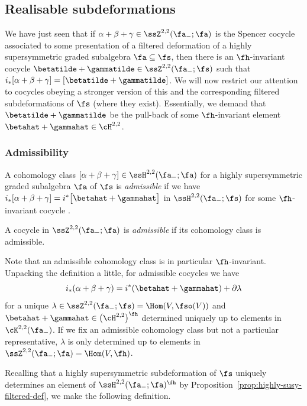 \subsection{Realisable subdeformations}
\label{sec:realisable-subdef}

We have just seen that if $\alpha+\beta+\gamma\in\ssZ^{2,2}(\fa_-;\fa)$ is the Spencer cocycle associated to some presentation of a filtered deformation of a highly supersymmetric graded subalgebra $\fa\subseteq\fs$, then there is an $\fh$-invariant cocycle $\betatilde+\gammatilde\in\ssZ^{2,2}(\fa_-;\fs)$ such that $i_*[\alpha+\beta+\gamma]=[\betatilde+\gammatilde]$. We will now restrict our attention to cocycles obeying a stronger version of this and the corresponding filtered subdeformations of $\fs$ (where they exist). Essentially, we demand that $\betatilde+\gammatilde$ be the pull-back of some $\fh$-invariant element $\betahat+\gammahat\in\cH^{2,2}$.

\subsubsection{Admissibility}

\begin{Definition}\label{def:admissible-class}
	A cohomology class $[\alpha+\beta+\gamma]\in \ssH^{2,2}(\fa_-;\fa)$ for a highly supersymmetric graded subalgebra $\fa$ of $\fs$ is \emph{admissible} if we have
$i_*[\alpha+\beta+\gamma]=i^*\big[\betahat+\gammahat\big]
$
	in $\ssH^{2,2}(\fa_-;\fs)$ for some $\fh$-invariant cocycle .
	
	A cocycle in $\ssZ^{2,2}(\fa_-;\fa)$ is \emph{admissible} if its cohomology class is admissible.
\end{Definition}

Note that an admissible cohomology class is in particular $\fh$-invariant. Unpacking the definition a little, for admissible cocycles we have
\begin{equation}\label{eq:admiss-cocycle-param}
	i_*(\alpha + \beta + \gamma) = i^*(\betahat + \gammahat) + \partial\lambda
\end{equation}
for a unique $\lambda\in\ssZ^{2,2}(\fa_-;\fs)=\Hom(V,\fso(V))$ and $\betahat+\gammahat\in\bigl(\cH^{2,2}\bigr)^\fh$ determined uniquely up to elements in $\cK^{2,2}(\fa_-)$. If we fix an admissible cohomology class but not a particular representative, $\lambda$ is only determined up to elements in $\ssZ^{2,2}(\fa_-;\fa)=\Hom(V,\fh)$.

Recalling that a highly supersymmetric subdeformation of $\fs$ uniquely determines an element of $\ssH^{2,2}(\fa_-;\fa)^\fh$ by Proposition~\ref{prop:highly-susy-filtered-def}, we make the following definition.

